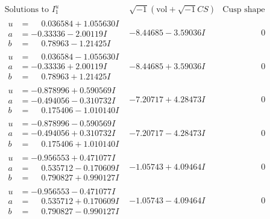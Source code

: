 \documentclass[1p]{elsarticle_modified}
\theoremstyle{definition}
\newcommand{\I}{\sqrt{-1}}
\begin{document}
$$\begin{array}{c|c|c}  
\text{Solutions to }I^u_{1}& \I (\text{vol} + \sqrt{-1}CS) & \text{Cusp shape}\\
 \hline 
\begin{aligned}
u &= \phantom{-}0.036584 + 1.055630 I \\
a &= -0.33336 - 2.00119 I \\
b &= \phantom{-}0.78963 - 1.21425 I\end{aligned}
 & -8.44685 - 3.59036 I & \phantom{-0.000000 } 0 \\ \hline\begin{aligned}
u &= \phantom{-}0.036584 - 1.055630 I \\
a &= -0.33336 + 2.00119 I \\
b &= \phantom{-}0.78963 + 1.21425 I\end{aligned}
 & -8.44685 + 3.59036 I & \phantom{-0.000000 } 0 \\ \hline\begin{aligned}
u &= -0.878996 + 0.590569 I \\
a &= -0.494056 - 0.310732 I \\
b &= \phantom{-}0.175406 - 1.010140 I\end{aligned}
 & -7.20717 + 4.28473 I & \phantom{-0.000000 } 0 \\ \hline\begin{aligned}
u &= -0.878996 - 0.590569 I \\
a &= -0.494056 + 0.310732 I \\
b &= \phantom{-}0.175406 + 1.010140 I\end{aligned}
 & -7.20717 - 4.28473 I & \phantom{-0.000000 } 0 \\ \hline\begin{aligned}
u &= -0.956553 + 0.471077 I \\
a &= \phantom{-}0.535712 - 0.170609 I \\
b &= \phantom{-}0.790827 + 0.990127 I\end{aligned}
 & -1.05743 + 4.09464 I & \phantom{-0.000000 } 0 \\ \hline\begin{aligned}
u &= -0.956553 - 0.471077 I \\
a &= \phantom{-}0.535712 + 0.170609 I \\
b &= \phantom{-}0.790827 - 0.990127 I\end{aligned}
 & -1.05743 - 4.09464 I & \phantom{-0.000000 } 0 \\ \hline\begin{aligned}

\end{aligned}
\end{array}$$
\end{document}
